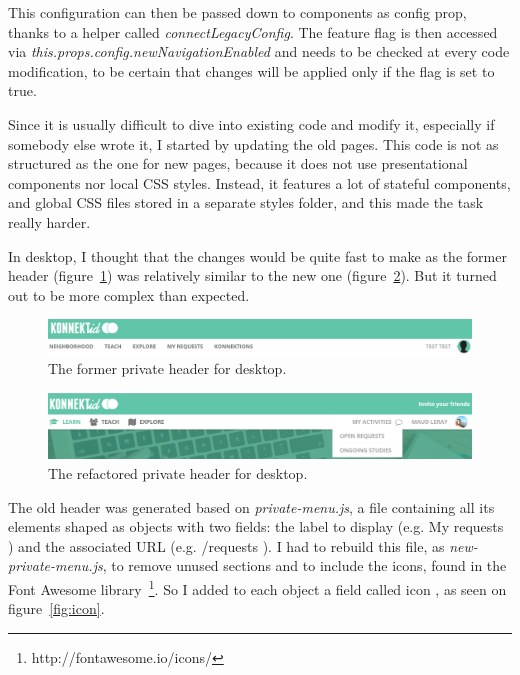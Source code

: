 This configuration can then be passed down to components as \guillemotleft{} config \guillemotright{} prop, thanks to a helper called \textit{connectLegacyConfig}. The feature flag is then accessed via \textit{this.props.config.newNavigationEnabled} and needs to be checked at every code modification, to be certain that changes will be applied only if the flag is set to true.

Since it is usually difficult to dive into existing code and modify it, especially if somebody else wrote it, I started by updating the old pages. This code is not as structured as the one for new pages, because it does not use presentational components nor local CSS styles. Instead, it features a lot of stateful components, and global CSS files stored in a separate \guillemotleft{} styles \guillemotright{} folder, and this made the task really harder. 

In desktop, I thought that the changes would be quite fast to make as the former header ({\sc figure}~\ref{fig:oldNavDesktop}) was relatively similar to the new one ({\sc figure}~\ref{fig:newNavDesktop}). But it turned out to be more complex than expected.

\begin{figure}[H]
    \centering
    \includegraphics[scale=0.3]{figure/oldNavDesktop.png}
    \caption{The former private header for desktop.}
    \label{fig:oldNavDesktop}
\end{figure}

\begin{figure}[H]
    \centering
    \includegraphics[scale=0.47]{figure/newNavDesktop.png}
    \caption{The refactored private header for desktop.}
    \label{fig:newNavDesktop}
\end{figure}

The old header was generated based on \textit{private-menu.js}, a file containing all its elements shaped as objects with two fields: the label to display (e.g. \guillemotleft{} My requests \guillemotright{}) and the associated URL (e.g. \guillemotleft{} /requests \guillemotright{}). I had to rebuild this file, as \textit{new-private-menu.js}, to remove unused sections and to include the icons, found in the Font Awesome library~\footnote{http://fontawesome.io/icons/}. So I added to each object a field called \guillemotleft{} icon \guillemotright{}, as seen on {\sc figure}~\ref{fig:icon}. 

